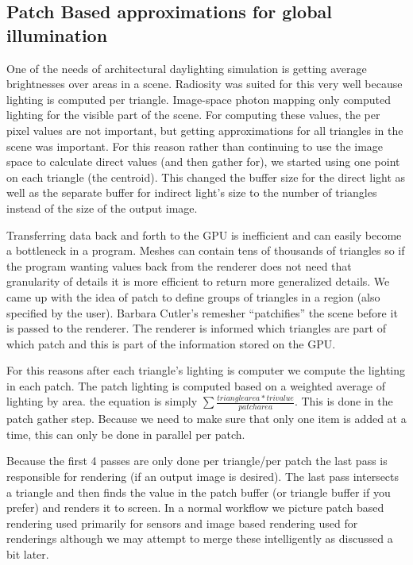   \subsection{Patch Based approximations for global illumination}
  
  One of the needs of architectural daylighting simulation is getting average brightnesses over areas in a scene.  Radiosity was suited for this very well because lighting is computed per triangle.  Image-space photon mapping only computed lighting for the visible part of the scene.  For computing these values, the per pixel values are not important, but getting approximations for all triangles in the scene was important.  For this reason rather than continuing to use the image space to calculate direct values (and then gather for), we started using one point on each triangle (the centroid).  This changed the buffer size for the direct light as well as the separate buffer for indirect light's size to the number of triangles instead of the size of the output image.  
  
  Transferring data back and forth to the GPU is inefficient and can easily become a bottleneck in a program.  Meshes can contain tens of thousands of triangles so if the program wanting values back from the renderer does not need that granularity of details it is more efficient to return more generalized details.  We came up with the idea of patch to define groups of triangles in a region (also specified by the user).  Barbara Cutler's remesher ``patchifies'' the scene before it is passed to the renderer.  The renderer is informed which triangles are part of which patch and this is part of the information stored on the GPU.
  
  For this reasons after each triangle's lighting is computer we compute the lighting in each patch.  The patch lighting is computed based on a weighted average of lighting by area. the equation is simply $\sum{\frac{trianglearea*trivalue}{patcharea}}$.  This is done in the patch gather step.  Because we need to make sure that only one item is added at a time, this can only be done in parallel per patch.
  
  Because the first 4 passes are only done per triangle/per patch the last pass is responsible for rendering (if an output image is desired).  The last pass intersects a triangle and then finds the value in the patch buffer (or triangle buffer if you prefer) and renders it to screen.  In a normal workflow we picture patch based rendering used primarily for sensors and image based rendering used for renderings although we may attempt to merge these intelligently as discussed a bit later.

